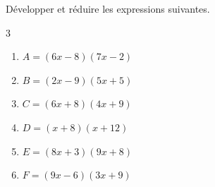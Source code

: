 {%
\begin{Exercice} %
Développer et réduire les expressions suivantes.
\vspace{-0.5cm}
\begin{multicols}{3}
\begin{enumerate}[itemsep=2em,label={}]
	\item \begin{minipage}[t]{\linewidth}$A = (6x-8)(7x-2)$\end{minipage}
	\item \begin{minipage}[t]{\linewidth}$B = (2x-9)(5x+5)$\end{minipage}
	\item \begin{minipage}[t]{\linewidth}$C = (6x+8)(4x+9)$\end{minipage}
	\item \begin{minipage}[t]{\linewidth}$D = (x+8)(x+12)$\end{minipage}
	\item \begin{minipage}[t]{\linewidth}$E = (8x+3)(9x+8)$\end{minipage}
	\item \begin{minipage}[t]{\linewidth}$F = (9x-6)(3x+9)$\end{minipage}
\end{enumerate}
\end{multicols}
\end{Exercice}

}
